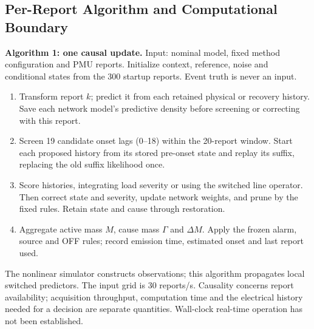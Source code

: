 \subsection{Per-Report Algorithm and Computational Boundary}

\noindent\textbf{Algorithm 1: one causal update.}
Input: nominal model, fixed method configuration and PMU reports.
Initialize context, reference, noise and conditional states from the 300
startup reports. Event truth is never an input.
\begin{enumerate}
\item Transform report $k$; predict it from each retained physical or
recovery history. Save each network model's predictive density before
screening or correcting with this report.
\item Screen 19 candidate onset lags (0--18) within the 20-report window. Start each proposed history
from its stored pre-onset state and replay its suffix, replacing the old
suffix likelihood once.
\item Score histories, integrating load severity or using the switched
line operator. Then correct state and severity, update network weights,
and prune by the fixed rules. Retain state and cause through restoration.
\item Aggregate active mass $M$, cause mass $\Gamma$ and $\Delta M$.
Apply the frozen alarm, source and OFF rules; record emission time,
estimated onset and last report used.
\end{enumerate}
The nonlinear simulator constructs observations; this algorithm propagates
local switched predictors. The input grid is 30 reports/s. Causality
concerns report availability; acquisition throughput, computation time
and the electrical history needed for a decision are separate quantities.
Wall-clock real-time operation has not been established.
